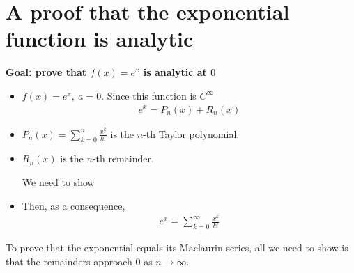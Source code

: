 \section{A proof that the exponential function is analytic}
\textbf{Goal: prove that \(f(x) = e^x\) is analytic at \(0\)}
\begin{itemize}
    \item \(f(x) = e^x,~ a = 0\).
          Since this function is \(C^\infty\)
          \begin{align*}
              e^x = P_n(x) + R_n(x)
          \end{align*}
    \item \(P_n(x) = \sum_{k = 0}^{n} \frac{x^k}{k!}\) is the \(n\)-th Taylor polynomial.
    \item \(R_n(x)\) is the \(n\)-th remainder. \begin{center}
              We need to show 
          \end{center}
    \item Then, as a consequence, \begin{align*}
              e^x = \sum_{k = 0}^{\infty} \frac{x^k}{k!}
          \end{align*}
\end{itemize}
To prove that the exponential equals its Maclaurin series, all we need to show is that the remainders approach \(0\) as \(n \to \infty\).

